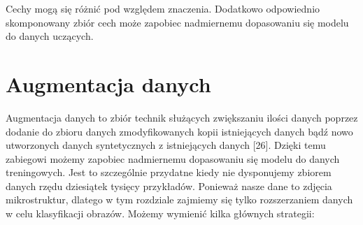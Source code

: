 \noindent Cechy mogą się różnić pod względem znaczenia. Dodatkowo odpowiednio skomponowany zbiór cech może zapobiec nadmiernemu dopasowaniu się modelu do danych uczących. 

\section{Augmentacja danych}
\label{cha:cha3.4}

Augmentacja danych to zbiór technik służących zwiększaniu ilości danych poprzez dodanie do zbioru danych zmodyfikowanych kopii istniejących danych bądź nowo utworzonych danych syntetycznych z istniejących danych [26]. Dzięki temu zabiegowi możemy zapobiec nadmiernemu dopasowaniu się modelu do danych treningowych. Jest to szczególnie przydatne kiedy nie dysponujemy zbiorem danych rzędu dziesiątek tysięcy przykładów. Ponieważ nasze dane to zdjęcia mikrostruktur, dlatego w tym rozdziale zajmiemy się tylko rozszerzaniem danych w celu klasyfikacji obrazów. Możemy wymienić kilka głównych strategii:

